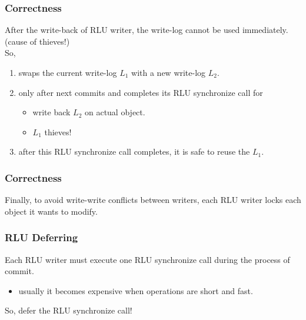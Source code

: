 \documentclass{beamer}
\begin{document}

\begin{frame}[t]
  \frametitle{Correctness}
  After the write-back of RLU writer, the write-log cannot be used immediately. (cause of thieves!)\\
  So,
  \begin{enumerate}
  \item swaps the current write-log \emph{$L_1$} with a new write-log \emph{$L_2$}.
  \item only after next commits and completes its RLU synchronize call for
    \begin{itemize}
    \item write back \emph{$L_2$} on actual object.
    \item \emph{$L_1$} thieves!
    \end{itemize}
  \item after this RLU synchronize call completes, it is safe to reuse the \emph{$L_1$}.
  \end{enumerate}
\end{frame}


\begin{frame}[t]
  \frametitle{Correctness}
  Finally, to avoid write-write conflicts between writers, each RLU writer locks each object it wants to modify.
  
\end{frame}


\begin{frame}[t]
  \frametitle{RLU Deferring}
  Each RLU writer must execute one RLU synchronize call during the process of commit.
  \begin{itemize}
  \item usually it becomes expensive when operations are short and fast.
  \end{itemize}

  \begin{center}
    So, defer the RLU synchronize call!
  \end{center}
  
\end{frame}

\end{document}
